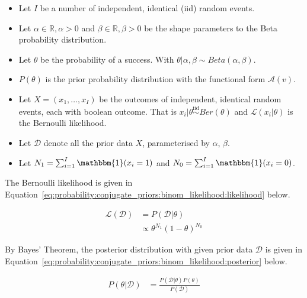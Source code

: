 \begin{itemize}
      \item Let $I$ be a number of independent, identical  (iid) random events.

      \item Let $\alpha \in \mathbb{R}, \alpha > 0$ and $\beta \in \mathbb{R}, \beta >0$ be the shape parameters to the Beta probability distribution.

      \item Let $\theta$ be the probability of a success. With $\theta | \alpha, \beta \sim Beta(\alpha, \beta)$.

      \item $P(\theta)$ is the prior probability distribution with the functional form $\mathcal{A}(v)$.

      \item Let $X = (x_{1}, \dots, x_{I})$ be the outcomes of independent, identical random events, each with boolean outcome. That is $x_{i} | \theta \overset{\text{iid}}{\sim} Ber(\theta)$ and $\mathcal{L}(x_{i} \vert \theta)$ is the Bernoulli likelihood.

      \item Let $\mathcal{D}$ denote all the prior data $X$, parameterised by $\alpha$, $\beta$.

      \item Let $N_{1} = \sum_{i=1}^{I} \mathbbm{1}(x_{i} = 1)$ and $N_{0} = \sum_{i=1}^{I} \mathbbm{1}(x_{i} = 0)$.
\end{itemize}

\noindent
The Bernoulli likelihood is given in Equation~\eqref{eq:probability:conjugate_priors:binom_likelihood:likelihood} below.

\begin{equation}
      \label{eq:probability:conjugate_priors:binom_likelihood:likelihood}
      \begin{split}
            \mathcal{L}(\mathcal{D}) &=  P(\mathcal{D} | \theta) \\
            &\propto \theta^{N_{1}}(1-\theta)^{N_{0}}
      \end{split}
\end{equation}

\noindent
By Bayes' Theorem, the posterior distribution with given prior data $\mathcal{D}$ is given in Equation~\eqref{eq:probability:conjugate_priors:binom_likelihood:posterior} below.

\begin{equation}
      \begin{split}
            \label{eq:probability:conjugate_priors:binom_likelihood:posterior}
            P(\theta \vert \mathcal{D}) &= \frac{P(\mathcal{D} | \theta) P(\theta)}{P(\mathcal{D})}
      \end{split}
\end{equation}

